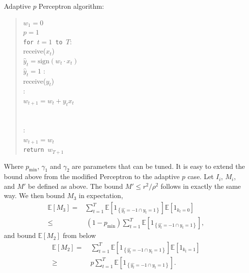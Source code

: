 \documentclass[12pt]{article}
\newcommand{\E}[0]{\mathbb{E}}
\begin{document}
\noindent Adaptive $p$ Perceptron algorithm:
\begin{quotation}
\noindent $w_1=0$\\
\noindent $p=1$\\
{\tt for $t=1$ to $T$}:\\
\indent receive($x_t$)\\
\indent $\widehat{y}_t=\mbox{sign}(w_t\cdot x_t)$\\
 $\widehat{y}_t =1$ : \\
\indent\indent receive($y_t$)\\
\indent{}:\\
\indent\indent\indent $w_{t+1} = w_t + y_t x_t$\\
\indent{}\\
\\
:\\
\indent\indent $w_{t+1} = w_t$\\
{\tt return $w_{T+1}$}
\end{quotation}
Where $p_{\min}$, $\gamma_1$ and $\gamma_2$ are parameters that can be tuned. It is easy to extend the bound above from the modified Perceptron to the adaptive $p$ case.  Let $I_i$, $M_i$, and $M'$ be defined as above. The bound $M'\leq r^2/\rho^2$ follows in exactly the same way.  We then bound $M_3$ in expectation, 
\begin{align*}
\E[M_3] = & \sum_{t=1}^T \E[1_{\left\{\widehat{y_t} = -1 \cap y_t = 1\right\}}]\E[1_{k_t = 0}] \\
 \leq &\ (1 - p_{\min})\sum_{t=1}^T \E[1_{\left\{\widehat{y_t} = -1 \cap y_t = 1\right\}}],
\end{align*}
and bound $\E[M_2]$ from below
\begin{align*}
\E[M_2] =&\ \sum_{t=1}^T \E[1_{\left\{\hat{y_t} = -1 \cap y_t = 1\right\}}]\E[1_{k_t = 1}] \\
\geq &\ p\sum_{t=1}^T \E[1_{\left\{\hat{y_t} = -1 \cap y_t = 1\right\}}].
\end{align*}
\end{document}
